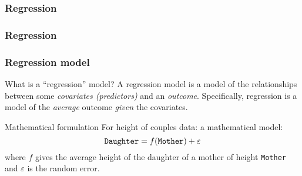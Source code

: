 \documentclass[handout]{beamer}
\begin{document}
   \begin{frame}
   \frametitle{Regression}
   \begin{center}
   \end{center}

   \end{frame}



   \begin{frame}
   \frametitle{Regression}
   \begin{center}
   \end{center}

   \end{frame}


   \begin{frame} \frametitle{Regression model}

   \begin{block}
   {What is a ``regression'' model? }
   A regression model is a model of the relationships between some {\em covariates (predictors)} and an {\em outcome}.
   Specifically, regression is a model of the {\em average} outcome {\em given}
   the covariates.
   \end{block}
   \begin{block}
   {Mathematical formulation}
   For height of couples data:
   a mathematical  model:
   $$
   {\tt Daughter} = f({\tt Mother}) + \varepsilon$$
   where $f$ gives the average height of the daughter of a mother of height {\tt Mother} and
   $\varepsilon$ is the random error.
   \end{block}
   \end{frame}
\end{document}
